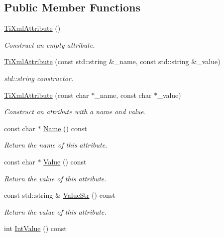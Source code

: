 \subsection*{Public Member Functions}
\begin{DoxyCompactItemize}
\item 
\hyperlink{class_ti_xml_attribute_a9cfa3c8179873fd485d83003b114f8e1}{Ti\-Xml\-Attribute} ()
\begin{DoxyCompactList}\small\item\em Construct an empty attribute. \end{DoxyCompactList}\item 
\hyperlink{class_ti_xml_attribute_a052213522caac3979960e0714063861d}{Ti\-Xml\-Attribute} (const std\-::string \&\-\_\-name, const std\-::string \&\-\_\-value)
\begin{DoxyCompactList}\small\item\em std\-::string constructor. \end{DoxyCompactList}\item 
\hyperlink{class_ti_xml_attribute_a759d0b76fb8fcf765ecab243bc14f05e}{Ti\-Xml\-Attribute} (const char $\ast$\-\_\-name, const char $\ast$\-\_\-value)
\begin{DoxyCompactList}\small\item\em Construct an attribute with a name and value. \end{DoxyCompactList}\item 
const char $\ast$ \hyperlink{class_ti_xml_attribute_a298a57287d305904ba6bd96ae6f78d3d}{Name} () const 
\begin{DoxyCompactList}\small\item\em Return the name of this attribute. \end{DoxyCompactList}\item 
const char $\ast$ \hyperlink{class_ti_xml_attribute_a0f874490eac8ca00ee0070765d0e97e3}{Value} () const 
\begin{DoxyCompactList}\small\item\em Return the value of this attribute. \end{DoxyCompactList}\item 
const std\-::string \& \hyperlink{class_ti_xml_attribute_a87705c3ccf9ee9417beb4f7cbacd4d33}{Value\-Str} () const 
\begin{DoxyCompactList}\small\item\em Return the value of this attribute. \end{DoxyCompactList}\item 
int \hyperlink{class_ti_xml_attribute_aa1a20ad59dc7e89a0ab265396360d50f}{Int\-Value} () const 

\end{DoxyCompactItemize}
